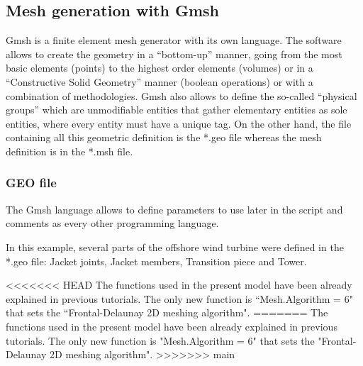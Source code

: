 \documentclass[a4]{article}
\begin{document}
\subsection{Mesh generation with Gmsh}
Gmsh \cite{gmsh, gmshweb} is a finite element mesh generator with its own language. The software allows to create the geometry in a “bottom-up” manner, going from the most basic elements (points) to the highest order elements (volumes) or in a “Constructive Solid Geometry” manner (boolean operations) or with a combination of methodologies. Gmsh also allows to define  the so-called “physical groups” which are unmodifiable entities that gather elementary entities as sole entities, where every entity must have a unique tag. On the other hand, the file containing all this geometric definition is the *.geo file whereas the mesh definition is in the *.msh file. 

\subsubsection{GEO file}
The Gmsh language allows to define parameters to use later in the script and comments as every other programming language. 

In this example, several parts of the offshore wind turbine were defined in the *.geo file: Jacket joints, Jacket members, Transition piece and Tower.  

<<<<<<< HEAD
The functions used in the present model have been already explained in previous tutorials. The only new function is ``Mesh.Algorithm = 6" that sets the ``Frontal-Delaunay 2D meshing algorithm".
=======
The functions used in the present model have been already explained in previous tutorials. The only new function is "Mesh.Algorithm = 6" that sets the "Frontal-Delaunay 2D meshing algorithm".
>>>>>>> main
\end{document}
